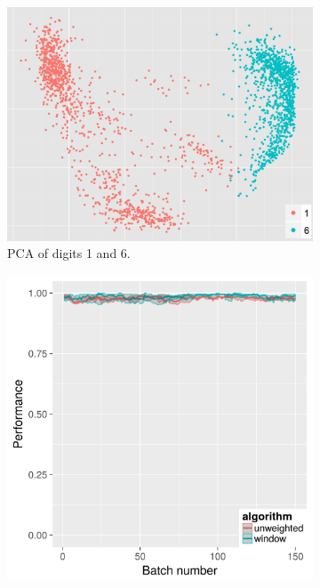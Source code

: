 \begin{figure}[H]

\begin{subfigure}{.3\textwidth}
  \centering
  \includegraphics[width=\linewidth]{PCA_pendigits_pairwise/pairwise_1_6_cropped.png}
  \caption{PCA of digits 1 and 6.}
\end{subfigure}%
\begin{subfigure}{.3\textwidth}
  \centering
  \includegraphics[width=\linewidth]{pendigits_2_alg/uci_pendigits_16_ci_one_size_purity.png}

\end{subfigure}
\end{figure}
